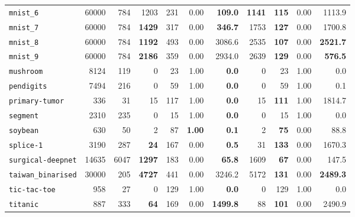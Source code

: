 \begin{tabular}{lccrrrrrrrr}
\texttt{mnist\_6} & \multicolumn{1}{r}{60000} & \multicolumn{1}{r}{784}  & 1203 & 231 & 0.00 & \textbf{109.0} & \textbf{1141} & \textbf{115} & 0.00 & 1113.9\\
\texttt{mnist\_7} & \multicolumn{1}{r}{60000} & \multicolumn{1}{r}{784}  & \textbf{1429} & 317 & 0.00 & \textbf{346.7} & 1753 & \textbf{127} & 0.00 & 1700.8\\
\texttt{mnist\_8} & \multicolumn{1}{r}{60000} & \multicolumn{1}{r}{784}  & \textbf{1192} & 493 & 0.00 & 3086.6 & 2535 & \textbf{107} & 0.00 & \textbf{2521.7}\\
\texttt{mnist\_9} & \multicolumn{1}{r}{60000} & \multicolumn{1}{r}{784}  & \textbf{2186} & 359 & 0.00 & 2934.0 & 2639 & \textbf{129} & 0.00 & \textbf{576.5}\\
\texttt{mushroom} & \multicolumn{1}{r}{8124} & \multicolumn{1}{r}{119}  & 0 & 23 & 1.00 & \textbf{0.0} & 0 & 23 & 1.00 & 0.0\\
\texttt{pendigits} & \multicolumn{1}{r}{7494} & \multicolumn{1}{r}{216}  & 0 & 59 & 1.00 & \textbf{0.0} & 0 & 59 & 1.00 & 0.1\\
\texttt{primary-tumor} & \multicolumn{1}{r}{336} & \multicolumn{1}{r}{31}  & 15 & 117 & 1.00 & \textbf{0.0} & 15 & \textbf{111} & 1.00 & 1814.7\\
\texttt{segment} & \multicolumn{1}{r}{2310} & \multicolumn{1}{r}{235}  & 0 & 15 & 1.00 & \textbf{0.0} & 0 & 15 & 1.00 & 0.0\\
\texttt{soybean} & \multicolumn{1}{r}{630} & \multicolumn{1}{r}{50}  & 2 & 87 & \textbf{1.00} & \textbf{0.1} & 2 & \textbf{75} & 0.00 & 88.8\\
\texttt{splice-1} & \multicolumn{1}{r}{3190} & \multicolumn{1}{r}{287}  & \textbf{24} & 167 & 0.00 & \textbf{0.5} & 31 & \textbf{133} & 0.00 & 1670.3\\
\texttt{surgical-deepnet} & \multicolumn{1}{r}{14635} & \multicolumn{1}{r}{6047}  & \textbf{1297} & 183 & 0.00 & \textbf{65.8} & 1609 & \textbf{67} & 0.00 & 147.5\\
\texttt{taiwan\_binarised} & \multicolumn{1}{r}{30000} & \multicolumn{1}{r}{205}  & \textbf{4727} & 441 & 0.00 & 3246.2 & 5172 & \textbf{131} & 0.00 & \textbf{2489.3}\\
\texttt{tic-tac-toe} & \multicolumn{1}{r}{958} & \multicolumn{1}{r}{27}  & 0 & 129 & 1.00 & \textbf{0.0} & 0 & 129 & 1.00 & 0.0\\
\texttt{titanic} & \multicolumn{1}{r}{887} & \multicolumn{1}{r}{333}  & \textbf{64} & 169 & 0.00 & \textbf{1499.8} & 88 & \textbf{101} & 0.00 & 2490.9\\

\end{tabular}
